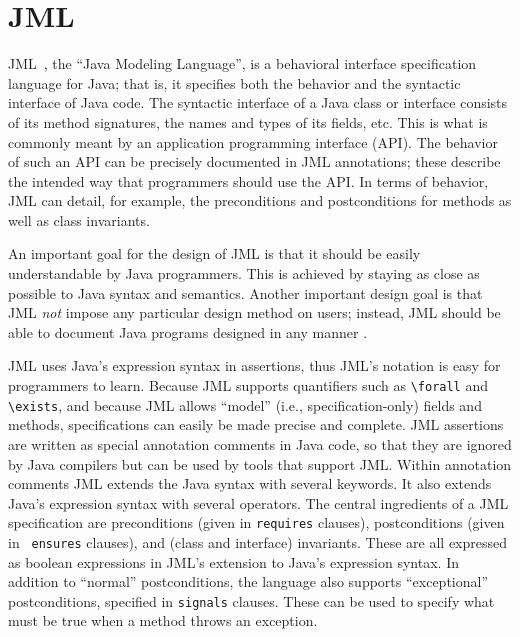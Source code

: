 \section{JML}
JML~\cite{Leavens-Baker-Ruby99b,Leavens-Baker-Ruby03}, the
``Java Modeling Language'', is a behavioral interface
specification language for Java; that is, it specifies both the behavior
and the syntactic interface of Java code.  The syntactic interface of
a Java class or interface consists of its method signatures,
the names and types of its fields, etc.
This is what is commonly meant by an application programming
interface (API).
The behavior of such an API can be precisely documented in JML annotations;
these describe the intended way that programmers should
use the API.  In terms of behavior, JML can detail, for example, the
preconditions and postconditions for methods as well as class
invariants.

An important goal for the design of JML is that it should be easily
understandable by Java programmers. This is achieved by staying as
close as possible to Java syntax and semantics.  Another important
design goal is that JML {\em not} impose any particular design method
on users; instead, JML should be able to document Java programs
designed in any manner \cite{Leavens-Baker-Ruby03}.

JML uses Java's expression syntax in assertions,
thus JML's notation is easy for programmers to learn.  
Because JML supports quantifiers such as
\verb_\forall_ and \verb_\exists_, and because JML allows ``model''
(i.e., specification-only) fields and methods, specifications can
easily be made precise and complete.
JML assertions are written as special
annotation comments in Java code,
so that they are ignored by Java compilers but can be used
by tools that support JML\@.  Within annotation comments JML extends the
Java syntax with several keywords.  It also extends Java's expression syntax with several
operators.
The central ingredients of a JML specification are preconditions
(given in {\tt requires} clauses), postconditions (given in {\tt
  ensures} clauses), and (class and interface) invariants.  These are
all expressed as boolean expressions in JML's extension to Java's
expression syntax.
In addition to ``normal'' postconditions, the language also supports
``exceptional'' postconditions, specified in {\tt signals} clauses.
These can be used to specify what must be true when a method throws an
exception. 



